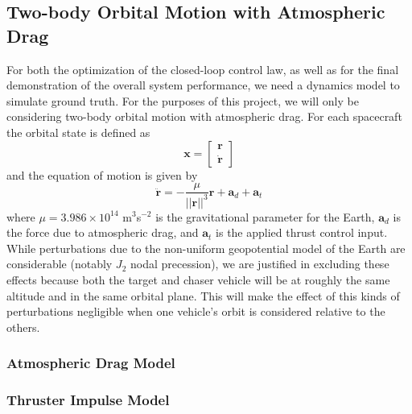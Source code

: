 \documentclass[conf]{new-aiaa}
\begin{document}
\subsection{Two-body Orbital Motion with Atmospheric Drag}
For both the optimization of the closed-loop control law, as well as for the final demonstration of the overall system performance, we need a dynamics model to simulate ground truth.  For the purposes of this project, we will only be considering two-body orbital motion with atmospheric drag.  For each spacecraft the orbital state is defined as
\begin{equation}\bm x=\begin{bmatrix}\bm r \\ \dot{\bm r}\end{bmatrix}\end{equation}
and the equation of motion is given by
\begin{equation}\ddot{\bm r}=-\frac{\mu}{||\bm r||^3}\bm r + \bm a_d + \bm a_t\label{eq:twobody}\end{equation}
where $\mu = 3.986\times10^{14}$ m$^3$s$^{-2}$ is the gravitational parameter for the Earth, $\bm a_d$ is the force due to atmospheric drag, and $\bm a_t$ is the applied thrust control input.  While perturbations due to the non-uniform geopotential model of the Earth are considerable (notably $J_2$ nodal precession), we are justified in excluding these effects because both the target and chaser vehicle will be at roughly the same altitude and in the same orbital plane.  This will make the effect of this kinds of perturbations negligible when one vehicle's orbit is considered relative to the others.

\subsubsection{Atmospheric Drag Model}

\subsubsection{Thruster Impulse Model}
\end{document}
